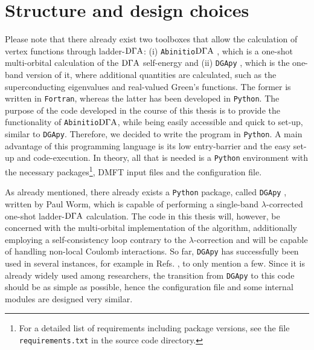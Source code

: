 \documentclass[../../main.tex]{subfiles}
\begin{document}
\section{Structure and design choices}

Please note that there already exist two toolboxes that allow the calculation of vertex functions through ladder-$\text{D}\Gamma\text{A}$: (i) \texttt{Abinitio$\text{D}\Gamma\text{A}$} \cite{abinitio dga, anna galler thesis, abinitio dga project}, which is a one-shot multi-orbital calculation of the $\text{D}\Gamma\text{A}$ self-energy and (ii) \texttt{DGApy} \cite{dgapy}, which is the one-band version of it, where additional quantities are calculated, such as the superconducting eigenvalues and real-valued Green's functions. The former is written in \texttt{Fortran}, whereas the latter has been developed in \texttt{Python}.
The purpose of the code developed in the course of this thesis is to provide the functionality of \texttt{Abinitio$\text{D}\Gamma\text{A}$}, while being easily accessible and quick to set-up, similar to \texttt{DGApy}. Therefore, we decided to write the program in \texttt{Python}. A main advantage of this programming language is its low entry-barrier and the easy set-up and code-execution. In theory, all that is needed is a \texttt{Python} environment with the necessary packages\footnote{For a detailed list of requirements including package versions, see the file \texttt{requirements.txt} in the source code directory.}, DMFT input files and the configuration file.

As already mentioned, there already exists a \texttt{Python} package, called \texttt{DGApy} \cite{dgapy}, written by Paul Worm, which is capable of performing a single-band $\lambda$-corrected one-shot ladder-$\text{D}\Gamma\text{A}$ calculation. The code in this thesis will, however, be concerned with the multi-orbital implementation of the algorithm, additionally employing a self-consistency loop contrary to the $\lambda$-correction and will be capable of handling non-local Coulomb interactions. So far, \texttt{DGApy} has successfully been used in several instances, for example in Refs. \cite{simone unconventional, paul spin fluc}, to only mention a few. Since it is already widely used among researchers, the transition from \texttt{DGApy} to this code should be as simple as possible, hence the configuration file and some internal modules are designed very similar.
\end{document}
